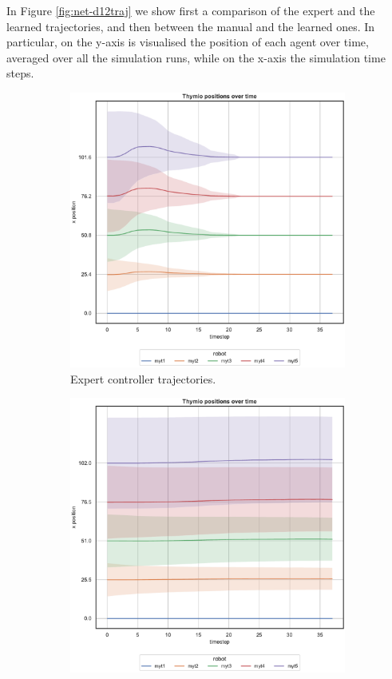 In Figure \ref{fig:net-d12traj} we show first a comparison of the expert and the 
learned trajectories, and then between the manual and the learned ones. 
In particular, on the y-axis is visualised the position of each agent over time, 
averaged over all the simulation runs, while on the x-axis the simulation 
time steps. 
\begin{figure}[!htb]
	\begin{center}
		\begin{subfigure}[h]{0.49\textwidth}
			\centering
			\includegraphics[width=.95\textwidth]{contents/images/net-d12/position-overtime-omniscient}%
			\caption{Expert controller trajectories.}
		\end{subfigure}
		\hfill
		\begin{subfigure}[h]{0.49\textwidth}
			\centering
			\includegraphics[width=\textwidth]{contents/images/net-d12/position-overtime-learned_distributed}

\end{subfigure}
\end{center}
\end{figure}
